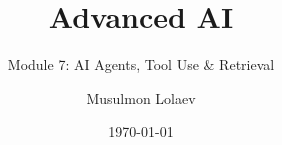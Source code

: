 \documentclass[aspectratio=169]{beamer}
\title{Advanced AI}
\subtitle{Module 7: AI Agents, Tool Use \& Retrieval}
\author{Musulmon Lolaev}
\institute{TQQT LLC}
\date{\today}
\begin{document}
\begin{frame}
\titlepage
\end{frame}

























\end{document}

